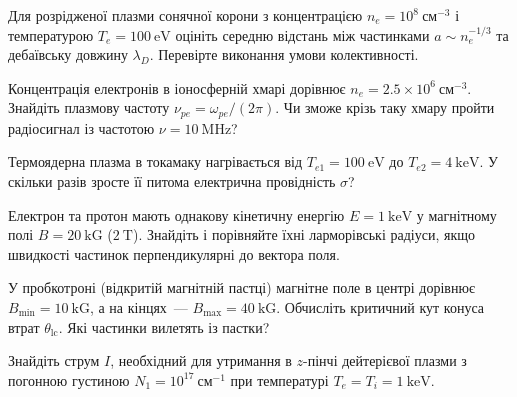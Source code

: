 \begin{problem}\label{prb:PlasmaCollective}
	 Для розрідженої плазми сонячної корони з концентрацією $n_e = 10^{8}~\mathrm{см}^{-3}$ і температурою $T_e = 100~\mathrm{eV}$ оцініть середню відстань між частинками $a \sim n_e^{-1/3}$ та дебаївську довжину $\lambda_D$. Перевірте виконання умови колективності.
\end{problem}

\begin{problem}\label{prb:PlasmaFrequency}
	 Концентрація електронів в іоносферній хмарі дорівнює $n_e = 2.5 \times 10^{6}~\mathrm{см}^{-3}$. Знайдіть плазмову частоту $\nu_{pe} = \omega_{pe}/(2\pi)$. Чи зможе крізь таку хмару пройти радіосигнал із частотою $\nu = 10~\mathrm{MHz}$?
\end{problem}

\begin{problem}\label{prb:PlasmaConductivity}
	 Термоядерна плазма в токамаку нагрівається від $T_{e1} = 100~\mathrm{eV}$ до $T_{e2} = 4~\mathrm{keV}$. У скільки разів зросте її питома електрична провідність $\sigma$?
\end{problem}

\begin{problem}\label{prb:PlasmaLarmor}
	 Електрон та протон мають однакову кінетичну енергію $E = 1~\mathrm{keV}$ у магнітному полі $B = 20~\mathrm{kG}$ ($2~\mathrm{T}$). Знайдіть і порівняйте їхні ларморівські радіуси, якщо швидкості частинок перпендикулярні до вектора поля.
\end{problem}

\begin{problem}\label{prb:PlasmaMirror}
	 У пробкотроні (відкритій магнітній пастці) магнітне поле в центрі дорівнює $B_{\min} = 10~\mathrm{kG}$, а на кінцях~--- $B_{\max} = 40~\mathrm{kG}$. Обчисліть критичний кут конуса втрат $\theta_{\text{lc}}$. Які частинки вилетять із пастки?
\end{problem}

\begin{problem}\label{prb:BennettPinch}
	 Знайдіть струм $I$, необхідний для утримання в $z$-пінчі дейтерієвої плазми з погонною густиною $N_1 = 10^{17}~\mathrm{см}^{-1}$ при температурі $T_e = T_i = 1~\mathrm{keV}$.
\end{problem}